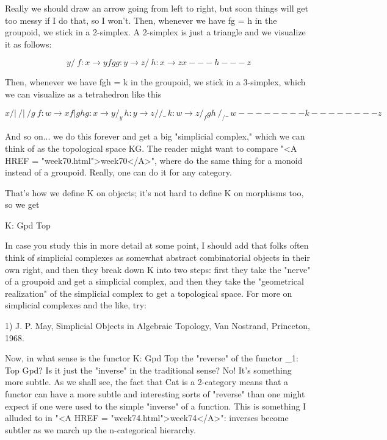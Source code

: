 Really we should draw an arrow going from left to right, but soon
things will get too messy if I do that, so I won't.  Then, whenever we
have fg = h in the groupoid, we stick in a 2-simplex.  A 2-simplex is just
a triangle and we visualize it as follows: 

$$

      y
     / \                       f: x \to  y
    f   g                      g: y \to  z
   /     \                     h: x \to  z
  x---h---z

$$
    
Then, whenever we have fgh = k in the groupoid, we stick in a 3-simplex,
which we can visualize as a tetrahedron like this

$$

          x                      
         /|\                    
        / | \                  
       /  g  \                   f: w \to  x      
      f   |   gh                 g: x \to  y
     /   _y_   \                 h: y \to  z
    /   /   \_  \                k: w \to  z
   / _fg      h_ \        
  /_/           \_\      
 w--------k--------z

$$
    
And so on... we do this forever and get a big "simplicial complex,"
which we can think of as the topological space KG.  The reader might
want to compare "<A HREF = "week70.html">week70</A>", where
do the same thing for a monoid instead of a groupoid.  Really, one can
do it for any category.

That's how we define K on objects; it's not hard to define K on
morphisms too, so we get 

                      K: Gpd \to  Top

In case you study this in more detail at some point, I should add that
folks often think of simplicial complexes as somewhat abstract
combinatorial objects in their own right, and then they break down K 
into two steps: first they take the "nerve" of a groupoid and get a
simplicial complex, and then they take the "geometrical realization" of
the simplicial complex to get a topological space.  For more on
simplicial complexes and the like, try:

1) J. P. May, Simplicial Objects in Algebraic Topology, Van Nostrand,
Princeton, 1968.


Now, in what sense is the functor K: Gpd \to  Top the
"reverse" of the functor \Pi _{1}: Top \to  Gpd?  Is it
just the "inverse" in the traditional sense?  No!  It's
something more subtle.  As we shall see, the fact that Cat is a
2-category means that a functor can have a more subtle and interesting
sorts of "reverse" than one might expect if one were used to
the simple "inverse" of a function.  This is something I
alluded to in "<A HREF = "week74.html">week74</A>": inverses
become subtler as we march up the n-categorical hierarchy.


